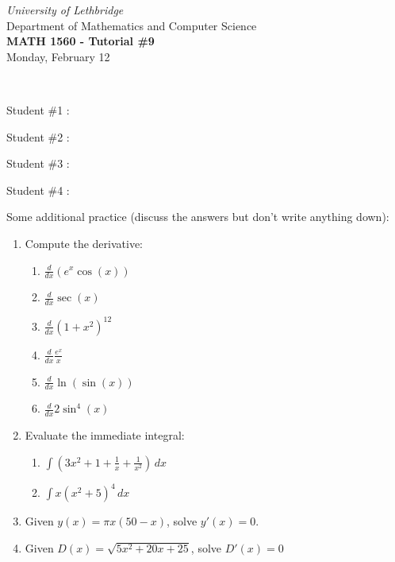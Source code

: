 \documentclass[12pt]{article}
\newcommand{\skipline}{\vspace{12pt}}
\newcommand{\di}{\displaystyle}
\begin{document}
\author{Instructor: Sean Fitzpatrick}
\thispagestyle{empty}
\begin{center}
\emph{University of Lethbridge}\\
Department of Mathematics and Computer Science\\
{\bf MATH 1560 - Tutorial \#9}\\
Monday, February 12
\end{center}
\skipline \ \noindent \skipline

Student \#1 :\underline{\hspace{348pt}}\\

\bigskip


Student \#2 :\underline{\hspace{348pt}}\\

\bigskip

Student \#3 :\underline{\hspace{348pt}}\\

\bigskip

Student \#4 :\underline{\hspace{348pt}}\\


\bigskip


\bigskip


\bigskip


Some additional practice (discuss the answers but don't write anything down):
\begin{enumerate}

\item Compute the derivative:
\begin{multicols}{3}
\begin{enumerate}
\item $\di\frac{d}{dx}(e^x\cos(x))$
\item $\di \frac{d}{dx}\sec(x)$
\item $\di\frac{d}{dx}(1+x^2)^{12}$
\item $\di\frac{d}{dx}\frac{e^x}{x}$
\item $\di\frac{d}{dx}\ln(\sin(x))$
\item $\di\frac{d}{dx}2\sin^4(x)$
\end{enumerate}
\end{multicols}

\item Evaluate the immediate integral:
\begin{multicols}{2}
\begin{enumerate}
\item $\di \int(3x^2+1+\frac1x+\frac{1}{x^2})\,dx$
\item $\di \int x(x^2+5)^4\,dx$
\end{enumerate}
\end{multicols}
\item Given $y(x)=\pi x(50-x)$, solve $y'(x)=0$.
\item Given $D(x) = \sqrt{5x^2+20x+25}$, solve $D'(x)=0$
\end{enumerate}
\end{document}

